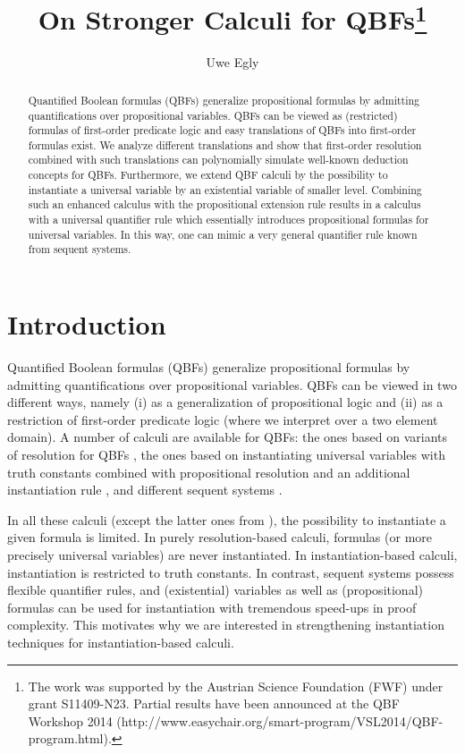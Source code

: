 \documentclass{llncs}
\title{On Stronger Calculi for QBFs\thanks{The work was supported by
    the Austrian Science Foundation (FWF) under grant
    S11409-N23. Partial results have been announced at the QBF
    Workshop 2014
    (http://www.easychair.org/smart-program/VSL2014/QBF-program.html).
}
}
\author{Uwe Egly}
\institute{
Institut f\"ur Informationssysteme 184/3,
Technische Universit\"at Wien, \\
Favoritenstrasse 9--11, A-1040 Vienna, Austria\\
 {email: \texttt{uwe@kr.tuwien.ac.at}}
}
\begin{document}
\maketitle
 
\begin{abstract}
Quantified Boolean formulas (QBFs) generalize propositional formulas
by admitting quantifications over propositional variables.  QBFs can
be viewed as (restricted) formulas of first-order predicate logic and
easy translations of QBFs into first-order formulas exist.  We analyze
different translations and show that first-order resolution combined
with such translations can polynomially simulate well-known deduction
concepts for QBFs. Furthermore, we extend QBF calculi by the
possibility to instantiate a universal variable by an existential
variable of smaller level. Combining such an enhanced calculus with
the propositional extension rule results in a calculus with a
universal quantifier rule which essentially introduces propositional
formulas for universal variables. In this way, one can mimic a very
general quantifier rule known from sequent 
systems.
\end{abstract}

\section{Introduction}\label{sec:intro}


Quantified Boolean formulas (QBFs) generalize propositional formulas
by admitting quantifications over propositional variables.  QBFs can
be viewed in two different ways, namely (i) as a generalization of
propositional logic and (ii) as a restriction of first-order predicate
logic (where we interpret over a two element domain). A number of
calculi are available for QBFs: the ones based on variants of
resolution for QBFs
\cite{DBLP:journals/iandc/BuningKF95,DBLP:conf/cp/Gelder12,DBLP:journals/fmsd/BalabanovJ12,BWJ:SAT14},
the ones based on instantiating universal variables with truth
constants combined with  propositional resolution and an additional
instantiation rule \cite{DBLP:conf/mfcs/BeyersdorffCJ14}, and
different sequent systems
\cite{DBLP:journals/aml/CookM05,Krajicek:1995,ESW-cj-2009,DBLP:conf/sat/Egly12}.

In all these calculi (except the latter ones from
\cite{DBLP:journals/aml/CookM05,Krajicek:1995,DBLP:conf/sat/Egly12}),
the possibility to instantiate a given formula is limited. In purely
resolution-based calculi, formulas (or more precisely universal
variables) are never instantiated. In instantiation-based calculi,
instantiation is restricted to truth constants. In contrast, sequent
systems possess flexible quantifier rules, and (existential) variables
as well as (propositional) formulas can be used for instantiation with
tremendous speed-ups in proof complexity. This motivates why we are
interested in strengthening instantiation techniques for
instantiation-based calculi.
\end{document}
